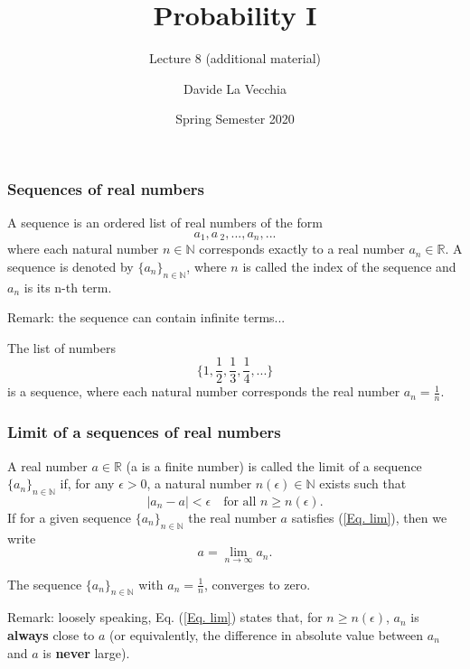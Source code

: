 \documentclass[notes=show,smaller,handout]{beamer}
\begin{document}
\title[S110015]{Probability I}
\subtitle{Lecture 8 (additional material)}
\author[La Vecchia]{Davide La Vecchia}
\date{Spring Semester 2020}
\maketitle


\begin{frame}

\frametitle{Sequences of real numbers }

\begin{definition}
 A sequence is an ordered list of real numbers
of the form%
\begin{equation*}
a_{1},a\,_{2},...,a_{n},...
\end{equation*}
where each natural number $n \in \mathbb{N}$ corresponds exactly to a real number $a_n \in \mathbb{R}$. A sequence is denoted
by $\{a_n \}_{n \in \mathbb{N}}$, where $n$ is called the index of the sequence and $a_n$ is its n-th term.
\end{definition}

\vspace{0.4cm} 

Remark: the sequence can contain infinite terms...

\begin{example}
The list of numbers 
$$
\Big\{1,\frac{1}{2},\frac{1}{3},\frac{1}{4},... \Big \} 
$$
is a sequence, where each natural number corresponds the real number $a_n = \frac{1}{n}$.
\end{example}



\end{frame}



\begin{frame}

\frametitle{Limit of a sequences of real numbers }

\begin{definition}
A real number  $a\in \mathbb{R}$ (a is a finite number) is called the limit of a sequence $\{a_n \}_{n \in \mathbb{N}}$ if, for any $\epsilon >0$, a natural number $n(\epsilon) \in \mathbb{N}$ exists such that
\begin{equation} \label{Eq. lim}
\vert a_{n}-a \vert < \epsilon \quad  \text{for all \ \ } n\geq n(\epsilon).
\end{equation}
If for a given sequence $\{a_n \}_{n \in \mathbb{N}}$ the real number $a$ satisfies (\ref{Eq. lim}), then we write
$$
a = \lim_{n\to \infty} a_n.
$$
\end{definition}

\begin{example}
The sequence $\{ a_n \}_{n \in \mathbb{N}}$
with $a_n = \frac{1}{n}$, converges to zero.
\end{example}

Remark: loosely speaking,  Eq. (\ref{Eq. lim}) states that, for $n \geq n(\epsilon)$, $a_n$ is \textbf{always} close to $a$ (or equivalently, the difference in absolute value between $a_n$ and $a$ is \textbf{never} large). 

\end{frame}%
\end{document}
